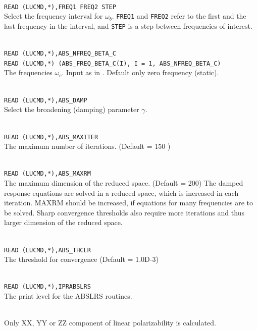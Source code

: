 \begin{description}
\item{} \\
\verb|READ (LUCMD,*),FREQ1 FREQ2 STEP |\\
Select the frequency interval for $\omega_b$.
\verb|FREQ1| and \verb|FREQ2| refer to the first and the last frequency in
the interval, and \verb|STEP| is a step between frequencies of interest.

\item{} \\
\verb|READ (LUCMD,*),ABS_NFREQ_BETA_C |\\
\verb|READ (LUCMD,*) (ABS_FREQ_BETA_C(I), I = 1, ABS_NFREQ_BETA_C) | \\
The frequencies
$\omega_c$. Input as in .
Default only zero frequency (static).

\item{}      \\
\verb|READ (LUCMD,*),ABS_DAMP |\\
   Select the broadening (damping) parameter $\gamma$.

\item{}      \\
\verb|READ (LUCMD,*),ABS_MAXITER |\\
   The maximum number of iterations.  (Default
= 150 )

\item{}      \\
\verb|READ (LUCMD,*),ABS_MAXRM |\\
   The maximum dimension of the reduced space.
(Default = 200) The damped response equations are solved in
a reduced space, which is increased
in each iteration. MAXRM should be increased, if equations for many
frequencies are to be solved. Sharp convergence thresholds also require
more iterations and thus larger dimension of the reduced space.

\item{}     \\
\verb|READ (LUCMD,*),ABS_THCLR|\\
   The threshold for convergence (Default = 1.0D-3)

\item{}     \\
\verb|READ (LUCMD,*),IPRABSLRS |\\
   The print level for the ABSLRS routines.

\item{}     \\
     Only XX, YY or ZZ component of linear polarizability is calculated.


\end{description}
